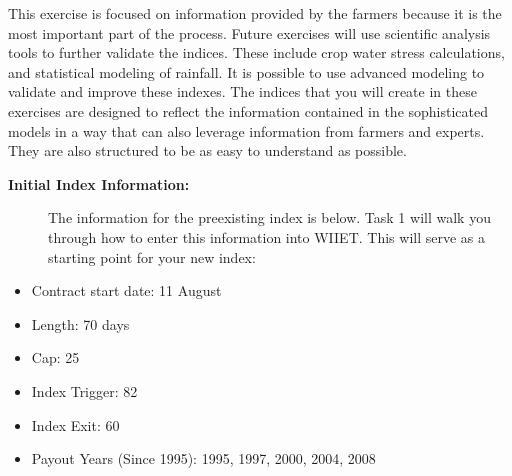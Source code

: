 \documentclass[letterpaper,10pt,english]{sphinxmanual}
\begin{document}
This exercise is focused on information provided by the farmers because it is the most important part of the process. Future exercises will use scientific analysis tools to further validate the indices. These include crop water stress calculations, and statistical modeling of rainfall. It is possible to use advanced modeling to validate and improve these indexes. The indices that you will create in these exercises are designed to reflect the information contained in the sophisticated models in a way that can also leverage information from farmers and experts. They are also structured to be as easy to understand as possible.
\begin{description}
\item[{\textbf{Initial Index Information:}}] \leavevmode
The information for the preexisting index is below. Task 1 will walk you through how to enter this information into WIIET. This will serve as a starting point for your new index:

\end{description}
\begin{itemize}
\item {} 
Contract start date: 11 August

\item {} 
Length: 70 days

\item {} 
Cap: 25

\item {} 
Index Trigger: 82

\item {} 
Index Exit: 60

\item {} 
Payout Years  (Since 1995): 1995, 1997, 2000, 2004, 2008

\end{itemize}
\end{document}
